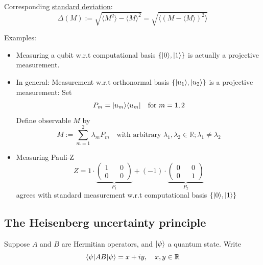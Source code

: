 Corresponding \underline{standard deviation}:
\begin{equation}
   \Delta(M) := \sqrt{\langle M^2 \rangle - \langle M \rangle^2} 
        = \sqrt{\langle (M - \langle M \rangle)^2 \rangle}
\end{equation}

Examples:
\begin{itemize}
    \item Measuring a qubit w.r.t computational basis $\{ \lvert0\rangle, \lvert1\rangle \}$ is actually a projective measurement.
    \item In general: Measurement w.r.t orthonormal basis $\{\lvert u_1\rangle, \lvert u_2\rangle\}$ is a projective measurement: Set 
        \begin{equation*}
            P_m = \lvert u_m\rangle \langle u_m\rvert \quad \text{for } m = 1, 2 
        \end{equation*}
        Define observable $M$ by 
        \begin{equation*}
            M := \sum_{m=1}^2 \lambda_m P_m \quad \text{with arbitrary } 
                \lambda_1, \lambda_2 \in \mathbb{R}; \lambda_1 \neq \lambda_2
        \end{equation*}
    \item Measuring Pauli-Z
    \begin{equation*}
        Z =  1 \cdot \underbrace{\begin{pmatrix*}
            1 && 0 \\
            0 && 0
        \end{pmatrix*}}_{P_1} + (-1) \cdot \underbrace{\begin{pmatrix*}
            0 && 0 \\
            0 && 1
        \end{pmatrix*}}_{P_2}
    \end{equation*}
    agrees with standard measurement w.r.t computational basis $\{ \lvert0\rangle, \lvert1\rangle \}$
\end{itemize}


\subsection{The Heisenberg uncertainty principle}

Suppose $A$ and $B$ are Hermitian operators, and $\lvert\psi\rangle$ a quantum state.
Write 
\begin{equation}
    \left \langle \psi \middle| AB \middle| \psi \right \rangle = x + iy, \quad x, y \in \mathbb{R}
\end{equation}

